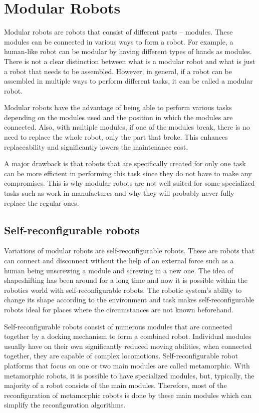 \documentclass[
  printed, %
  color,   %
  notable, %
  oneside, %
  nolof,   %
  nolot,   %
  nocover,
]{fithesis3}
\begin{document}
\chapter{Modular Robots}

Modular robots are robots that consist of different parts -- modules.
These modules can be connected in various ways to form a robot.
For example, a human-like robot can be modular by having different types of hands as modules.
There is not a clear distinction between what is a modular robot and what is just a robot that needs to be assembled. However, in general, if a robot can be assembled in multiple ways to perform different tasks, it can be called a modular robot.

Modular robots have the advantage of being able to perform various tasks depending on the modules used and the position in which the modules are connected.
Also, with multiple modules, if one of the modules break, there is no need to replace the whole robot, only the part that broke.
This enhances replaceability and significantly lowers the maintenance cost.

A major drawback is that robots that are specifically created for only one task can be more efficient in performing this task since they do not have to make any compromises.
This is why modular robots are not well suited for some specialized tasks such as work in manufactures and why they will probably never fully replace the regular ones.

\section{Self-reconfigurable robots}

Variations of modular robots are self-reconfigurable robots.
These are robots that can connect and disconnect without the help of an external force such as a human being unscrewing a module and screwing in a new one.
The idea of shapeshifting has been around for a long time and now it is possible within the robotics world with self-reconfigurable robots.
The robotic system's ability to change its shape according to the environment and task makes self-reconfigurable robots ideal for places where the circumstances are not known beforehand.

Self-reconfigurable robots consist of numerous modules that are connected together by a docking mechanism to form a combined robot.
Individual modules usually have on their own significantly reduced moving abilities, when connected together, they are capable of complex locomotions.
Self-reconfigurable robot platforms that focus on one or two main modules are called metamorphic.
With metamorphic robots, it is possible to have specialized modules, but, typically, the majority of a robot consists of the main modules.
Therefore, most of the reconfiguration of metamorphic robots is done by these main modules which can simplify the reconfiguration algorithms.
\end{document}
